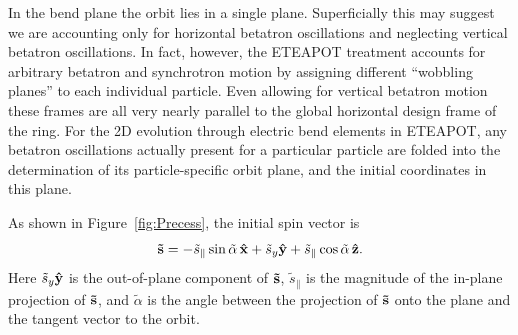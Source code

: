 \documentclass[]{article}
\begin{document}
In the bend plane the orbit lies in a single plane.
Superficially this may suggest we are accounting
only for horizontal betatron oscillations and neglecting vertical 
betatron oscillations. In fact, however, the
ETEAPOT treatment accounts for arbitrary betatron and synchrotron
motion by assigning different ``wobbling planes'' to each
individual particle. Even allowing for vertical betatron motion
these frames are all very nearly parallel to the global 
horizontal design frame of the ring.
For the 2D evolution through electric bend elements 
in ETEAPOT, any betatron oscillations actually present for
a particular particle are folded into the determination of
its particle-specific orbit plane, and the initial coordinates in 
this plane.

As shown in Figure~\ref{fig:Precess}, the initial spin vector is
%
\begin{equation}
{\bf \tilde s}
 = 
 -\tilde s_{\parallel}\sin\tilde\alpha\,{\bf\hat x}
 +\tilde s_y{\bf\hat y} 
 +\tilde s_{\parallel}\cos\tilde\alpha\,{\bf\hat z}.
\label{eq:SpinPrecess.9}
\end{equation}
%
Here $\tilde s_y{\bf\hat y}$ is the out-of-plane component of ${\bf \tilde s}$,
$\tilde s_{\parallel}$ is the magnitude of the in-plane projection of ${\bf \tilde s}$, 
and $\tilde\alpha$
is the angle between the projection of ${\bf \tilde s}$ onto the plane
and the tangent vector to the orbit.
\end{document}
